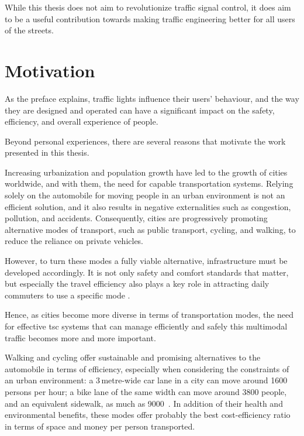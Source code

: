 \noindent While this thesis does not aim to revolutionize traffic signal control, it does aim to be a useful contribution towards making traffic engineering better for all users of the streets.

\medskip




\section{Motivation} \label{sec:motivation}

As the preface explains, traffic lights influence their users' behaviour, and the way they are designed and operated can have a significant impact on the safety, efficiency, and overall experience of people.

Beyond personal experiences, there are several reasons that motivate the work presented in this thesis.

\medskip

\noindent Increasing urbanization and population growth have led to the growth of cities worldwide, and with them, the need for capable transportation systems. Relying solely on the automobile for moving people in an urban environment is not an efficient solution, and it also results in negative externalities such as congestion, pollution, and accidents. Consequently, cities are progressively promoting alternative modes of transport, such as public transport, cycling, and walking, to reduce the reliance on private vehicles.

However, to turn these modes a fully viable alternative, infrastructure must be developed accordingly. It is not only safety and comfort standards that matter, but especially the travel efficiency also plays a key role in attracting daily commuters to use a specific mode \cite{Rietveld2004,Brunner2024}.

Hence, as cities become more diverse in terms of transportation modes, the need for effective \acrfull{tsc} systems that can manage efficiently and safely this multimodal traffic becomes more and more important. 

Walking and cycling offer sustainable and promising alternatives to the automobile in terms of efficiency, especially when considering the constraints of an urban environment: a 3\,metre-wide car lane in a city can move around 1600 persons per hour; a bike lane of the same width can move around 3800 people, and an equivalent sidewalk, as much as 9000~\cite{natco2013}. In addition of their health and environmental benefits, these modes offer probably the best cost-efficiency ratio in terms of space and money per person transported.

